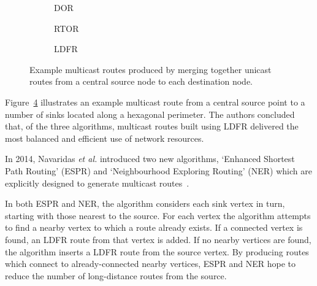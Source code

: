 			\begin{figure}
				\center
				\begin{subfigure}{0.3\linewidth}
					\center
					
					\caption{DOR}
					\label{fig:simple-routers-dor}
				\end{subfigure}
				\begin{subfigure}{0.3\linewidth}
					\center
					
					\caption{RTOR}
					\label{fig:simple-routers-dor}
				\end{subfigure}
				\begin{subfigure}{0.3\linewidth}
					\center
					
					\caption{LDFR}
					\label{fig:simple-routers-dor}
				\end{subfigure}
				
				\caption[Multicast routes produced by merging unicast routes.]%
				{Example multicast routes produced by merging together unicast
				routes from a central source node to each destination node.}
				\label{fig:simple-routers}
			\end{figure}
			
			Figure~\ref{fig:simple-routers} illustrates an example multicast route
			from a central source point to a number of sinks located along a
			hexagonal perimeter. The authors concluded that, of the three algorithms,
			multicast routes built using LDFR delivered the most balanced and
			efficient use of network resources.
			
			In 2014, Navaridas \emph{et al.} introduced two new algorithms, `Enhanced
			Shortest Path Routing' (ESPR) and `Neighbourhood Exploring Routing' (NER)
			which are explicitly designed to generate multicast
			routes~\cite{navaridas14}.
			
			In both ESPR and NER, the algorithm considers each sink vertex in turn,
			starting with those nearest to the source. For each vertex the algorithm
			attempts to find a nearby vertex to which a route already exists. If a
			connected vertex is found, an LDFR route from that vertex is added. If no
			nearby vertices are found, the algorithm inserts a LDFR route from the
			source vertex. By producing routes which connect to already-connected
			nearby vertices, ESPR and NER hope to reduce the number of long-distance
			routes from the source.
			

